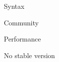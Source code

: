 \begin{frame}
  \begin{center}
    Syntax
  \end{center}
\end{frame}

\begin{frame}
  \begin{center}
    Community
  \end{center}
\end{frame}

\begin{frame}
  \begin{center}
    Performance
  \end{center}
\end{frame}

\begin{frame}
  \begin{center}
    No stable version
  \end{center}
\end{frame}